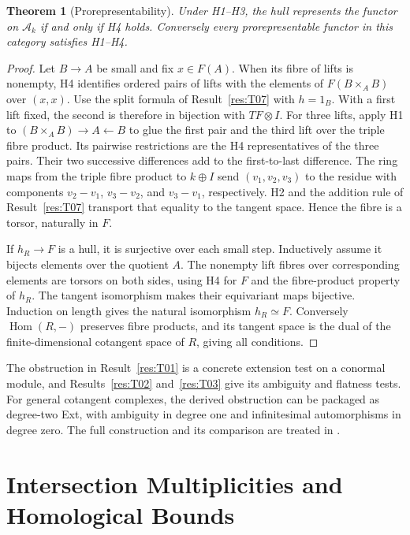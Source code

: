 \documentclass[11pt,oneside,openany]{book}
\newtheorem{theorem}{Theorem}[chapter]
\theoremstyle{definition}
\theoremstyle{remark}
\begin{document}
\begin{theorem}[Prorepresentability]\label{res:T10}
Under H1--H3, the hull represents the functor on \(\mathcal A_k\)
if and only if H4 holds. Conversely every prorepresentable
functor in this category satisfies H1--H4.
\end{theorem}
\begin{proof}
Let \(B\to A\) be small and fix \(x\in F(A)\). When its fibre
of lifts is nonempty, H4 identifies ordered pairs of lifts with
the elements of \(F(B\times_A B)\) over \((x,x)\).
Use the split formula of Result~\ref{res:T07} with \(h=1_B\).
With a first lift fixed, the second is therefore in bijection
with \(TF\otimes I\). For three lifts, apply H1 to
\((B\times_A B)\to A\leftarrow B\) to glue the first pair
and the third lift over the triple fibre product. Its pairwise
restrictions are the H4 representatives of the three pairs.
Their two successive differences add to the first-to-last
difference. The ring maps
from the triple fibre product to \(k\oplus I\) send
\((v_1,v_2,v_3)\) to the residue with components \(v_2-v_1\),
\(v_3-v_2\), and \(v_3-v_1\), respectively. H2 and the addition
rule of Result~\ref{res:T07} transport that equality to the
tangent space. Hence the fibre is a torsor, naturally in \(F\).

If \(h_R\to F\) is a hull, it is surjective over each small step.
Inductively assume it bijects elements over the quotient \(A\).
The nonempty lift fibres over corresponding elements are torsors
on both sides, using H4 for \(F\) and the fibre-product property
of \(h_R\). The tangent isomorphism makes their equivariant
maps bijective. Induction on length gives the natural isomorphism
\(h_R\simeq F\). Conversely \(\operatorname{Hom}(R,-)\) preserves
fibre products, and its tangent space is the dual of the
finite-dimensional cotangent space of \(R\), giving all conditions.
\end{proof}

The obstruction in Result~\ref{res:T01} is a concrete extension
test on a conormal module, and Results~\ref{res:T02} and~\ref{res:T03}
give its ambiguity and flatness tests. For general cotangent
complexes, the derived obstruction can be packaged as degree-two
Ext, with ambiguity in degree one and infinitesimal automorphisms
in degree zero. The full construction and its comparison are
treated in \cite[\S16]{st-cot}.
\chapter{Intersection Multiplicities and Homological Bounds}
\label{ch:intersection-multiplicities}
\end{document}
